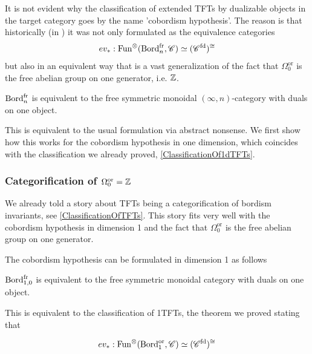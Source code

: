 It is not evident why the classification of extended TFTs by dualizable objects in the target category
goes by the name 'cobordism hypothesis'. The reason is that historically (in \cite{Baez_1995}) it was not
only formulated
 as the equivalence categories
 $$ev_{\ast}:\operatorname{Fun}^{\otimes}(\operatorname{Bord}_{n}^{\operatorname{fr}},\mathscr{C})\simeq (\mathscr{C}^{\operatorname{fd}})^{\cong}$$
 but also in an equivalent way that is a vast generalization of the fact that $\Omega_{0}^{\operatorname{or}}$ is the free
  abelian group on one generator, i.e. $\mathbb{Z}$. 
  \begin{thm}
$\operatorname{Bord}_{n}^{\operatorname{fr}}$ is equivalent to the free symmetric monoidal $(\infty,n)$-category with duals on one object.
  \end{thm}
  This is equivalent to the usual formulation via abstract nonsense. We first show how this works
   for the cobordism hypothesis
  in one dimension, which coincides with the classification we already proved, \ref{ClassificationOf1dTFTs}.
  \subsubsection{Categorification of  \texorpdfstring{$\Omega_{0}^{\operatorname{or}}=\mathbb{Z}$}{0}}\label{FREEBORD1}
  We already told a story about TFTs being a categorification of bordism invariants, see \ref{ClassificationOfTFTs}.
  This story fits very well with the cobordism hypothesis in dimension 1 and the fact that 
  $\Omega_{0}^{\operatorname{or}}$ is the free abelian group on one generator. 
  
  The cobordism hypothesis
  can be formulated in dimension 1 as follows 
  \begin{thm}[Cobordism hypothesis for $n=1$]
$\operatorname{Bord}_{1,0}^{\operatorname{fr}}$ is equivalent to the free symmetric monoidal category with duals on one object.
  \end{thm}
This is equivalent to the classification of 1TFTs, the theorem we proved stating that 
\begin{thm}
$$ev_{\ast}:\operatorname{Fun}^{\otimes}(\operatorname{Bord}_{1}^{\operatorname{or}},\mathscr{C})\simeq (\mathscr{C}^{\operatorname{fd}})^{\cong}$$
\end{thm}
 
